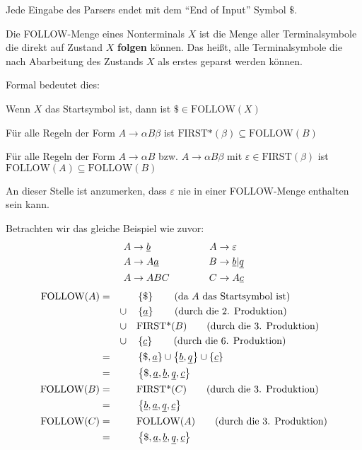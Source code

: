 \begin{defn}
Jede Eingabe des Parsers endet mit dem ``End of Input'' Symbol $\$$.
\end{defn}
\begin{defn}
Die FOLLOW-Menge eines Nonterminals $X$ ist die Menge aller Terminalsymbole die direkt auf Zustand $X$ \textbf{folgen} können.
Das heißt, alle Terminalsymbole die nach Abarbeitung des Zustands $X$ als erstes geparst werden können.

Formal bedeutet dies:
\begin{\whichenum}
\item Wenn $X$ das Startsymbol ist, dann ist $\$ \in \text{FOLLOW}(X)$
\item Für alle Regeln der Form $A \to \alpha B \beta$ ist $\text{FIRST*}(\beta) \subseteq \text{FOLLOW}(B)$
\item Für alle Regeln der Form $A \to \alpha B$ bzw. $A \to \alpha B \beta$ mit $\varepsilon \in \text{FIRST}(\beta)$
ist $\text{FOLLOW}(A) \subseteq \text{FOLLOW}(B)$
\end{\whichenum}
\end{defn}
An dieser Stelle ist anzumerken, dass $\varepsilon$ nie in einer FOLLOW-Menge enthalten sein kann.
\newpage
\begin{bsp}
Betrachten wir das gleiche Beispiel wie zuvor:
\begin{align*}
A &\to \underline{b} &\qquad&& A &\to \varepsilon \\
A &\to A \underline{a} &\qquad&& B &\to \underline{b} | \underline{q} \\
A &\to A B C &\qquad&& C &\to A \underline{c}
\end{align*}
\begin{align*}
\text{FOLLOW}(A) &=& &\left\{\$\right\} \tag{da $A$ das Startsymbol ist} \\
                 &\quad& \cup \quad &\left\{\underline{a}\right\} \tag{durch die 2. Produktion} \\
                 &\quad& \cup \quad &\text{FIRST*}(B) \tag{durch die 3. Produktion} \\
                 &\quad& \cup \quad &\left\{\underline{c}\right\} \tag{durch die 6. Produktion} \\
                 &=& &\left\{\$, \underline{a}\right\} \cup \left\{\underline{b},\underline{q}\right\} \cup \left\{\underline{c}\right\} \\
                 &=& &\left\{\$, \underline{a},\underline{b},\underline{q},\underline{c}\right\} \\
\text{FOLLOW}(B) &=& &\text{FIRST*}(C) \tag{durch die 3. Produktion} \\
                 &=& &\left\{\underline{b},\underline{a},\underline{q},\underline{c}\right\} \\
\text{FOLLOW}(C) &=& &\text{FOLLOW}(A) \tag{durch die 3. Produktion} \\
                 &=& &\left\{\$, \underline{a},\underline{b},\underline{q},\underline{c}\right\}
\end{align*}
\end{bsp}

